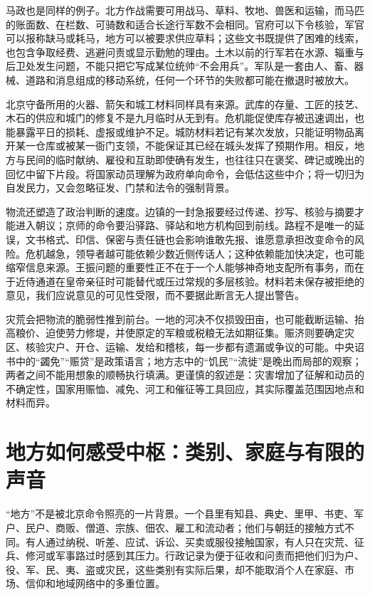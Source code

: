 马政也是同样的例子。北方作战需要可用战马、草料、牧地、兽医和运输，而马匹的账面数、在栏数、可骑数和适合长途行军数不会相同。官府可以下令核验，军官可以报称缺马或耗马，地方可以被要求供应草料；这些文书既提供了困难的线索，也包含争取经费、逃避问责或显示勤勉的理由。土木以前的行军若在水源、辎重与后卫处发生问题，不能只把它写成某位统帅“不会用兵”。军队是一套由人、畜、器械、道路和消息组成的移动系统，任何一个环节的失败都可能在撤退时被放大。

北京守备所用的火器、箭矢和城工材料同样具有来源。武库的存量、工匠的技艺、木石的供应和城门的修复不是九月临时从无到有。危机能促使库存被迅速调出，也能暴露平日的损耗、虚报或维护不足。城防材料若记有某次发放，只能证明物品离开某一仓库或被某一衙门支领，不能保证其已经在城头发挥了预期作用。相反，地方与民间的临时献纳、雇役和互助即使确有发生，也往往只在褒奖、碑记或晚出的回忆中留下片段。将国家动员理解为政府单向命令，会低估这些中介；将一切归为自发民力，又会忽略征发、门禁和法令的强制背景。

物流还塑造了政治判断的速度。边镇的一封急报要经过传递、抄写、核验与摘要才能进入朝议；京师的命令要沿驿路、驿站和地方机构回到前线。路程不是唯一的延误，文书格式、印信、保密与责任链也会影响谁敢先报、谁愿意承担改变命令的风险。危机越急，领导者越可能依赖少数近侧传话人；这种依赖能加快决定，也可能缩窄信息来源。王振问题的重要性正不在于一个人能够神奇地支配所有事务，而在于近侍通道在皇帝亲征时可能替代或压过常规的多层核验。材料若未保存被拒绝的意见，我们应说意见的可见性受限，而不要据此断言无人提出警告。

灾荒会把物流的脆弱性推到前台。一地的河决不仅损毁田亩，也可能截断运输、抬高粮价、迫使劳力修堤，并使原定的军粮或税粮无法如期征集。赈济则要确定灾区、核验灾户、开仓、运输、发给和稽核，每一步都有遗漏或争议的可能。中央诏书中的“蠲免”“赈贷”是政策语言；地方志中的“饥民”“流徙”是晚出而局部的观察；两者之间不能用想象的顺畅执行填满。更谨慎的叙述是：灾害增加了征解和动员的不确定性，国家用赈恤、减免、河工和催征等工具回应，其实际覆盖范围因地点和材料而异。

\section{地方如何感受中枢：类别、家庭与有限的声音}

“地方”不是被北京命令照亮的一片背景。一个县里有知县、典史、里甲、书吏、军户、民户、商贩、僧道、宗族、佃农、雇工和流动者；他们与朝廷的接触方式不同。有人通过纳税、听差、应试、诉讼、买卖或服役接触国家，有人只在灾荒、征兵、修河或军事路过时感到其压力。行政记录为便于征收和问责而把他们归为户、役、军、民、夷、盗或灾民，这些类别有实际后果，却不能取消个人在家庭、市场、信仰和地域网络中的多重位置。

